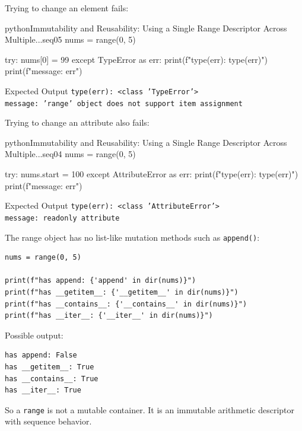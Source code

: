 Trying to change an element fails:

\begin{codebox}[]{python}{Immutability and Reusability: Using a Single Range Descriptor Across Multiple...}{seq05}
nums = range(0, 5)

try:
    nums[0] = 99
except TypeError as err:
    print(f"type(err): {type(err)}")
    print(f"message: {err}")
\end{codebox}


\begin{iobox}{Expected Output}
\texttt{type(err): <class 'TypeError'>} \\
\texttt{message: 'range' object does not support item assignment} \\
\end{iobox}


Trying to change an attribute also fails:

\begin{codebox}[]{python}{Immutability and Reusability: Using a Single Range Descriptor Across Multiple...}{seq04}
nums = range(0, 5)

try:
    nums.start = 100
except AttributeError as err:
    print(f"type(err): {type(err)}")
    print(f"message: {err}")
\end{codebox}


\begin{iobox}{Expected Output}
\texttt{type(err): <class 'AttributeError'>} \\
\texttt{message: readonly attribute} \\
\end{iobox}


The range object has no list-like mutation methods such as \texttt{append()}:

\begin{verbatim}
nums = range(0, 5)

print(f"has append: {'append' in dir(nums)}")
print(f"has __getitem__: {'__getitem__' in dir(nums)}")
print(f"has __contains__: {'__contains__' in dir(nums)}")
print(f"has __iter__: {'__iter__' in dir(nums)}")
\end{verbatim}

Possible output:

\begin{verbatim}
has append: False
has __getitem__: True
has __contains__: True
has __iter__: True
\end{verbatim}

So a \texttt{range} is not a mutable container. It is an immutable arithmetic descriptor with sequence behavior.

